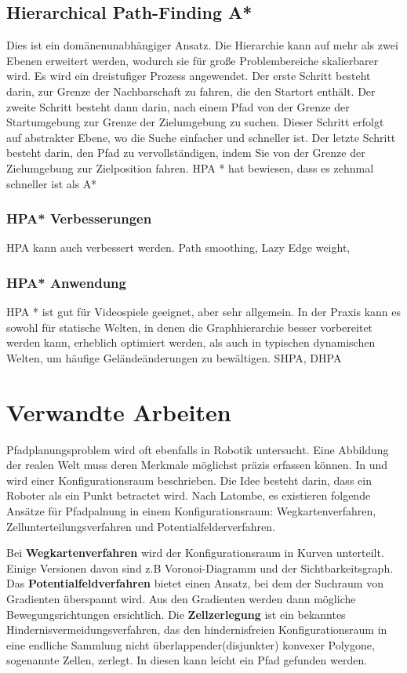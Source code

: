 \subsection{Hierarchical Path-Finding A*}
Dies ist ein domänenunabhängiger Ansatz. Die Hierarchie kann auf mehr als zwei Ebenen erweitert werden, wodurch sie für große Problembereiche skalierbarer wird. Es wird ein dreistufiger Prozess angewendet. Der erste Schritt besteht darin, zur Grenze der Nachbarschaft zu fahren, die den Startort enthält. Der zweite Schritt besteht dann darin, nach einem Pfad von der Grenze der Startumgebung zur Grenze der Zielumgebung zu suchen. Dieser Schritt erfolgt auf abstrakter Ebene, wo die Suche einfacher und schneller ist. Der letzte Schritt besteht darin, den Pfad zu vervollständigen, indem Sie von der Grenze der Zielumgebung zur Zielposition fahren. HPA * hat bewiesen, dass es zehnmal schneller ist als A*\cite{hpa}

\subsubsection{HPA* Verbesserungen}
HPA kann auch verbessert werden. Path smoothing, Lazy Edge weight,

\subsubsection{HPA* Anwendung}
HPA * ist gut für Videospiele geeignet, aber sehr allgemein. In der Praxis kann es sowohl für statische Welten, in denen die Graphhierarchie besser vorbereitet werden kann, erheblich optimiert werden, als auch in typischen dynamischen Welten, um häufige Geländeänderungen zu bewältigen. 
SHPA, 
DHPA






\section{Verwandte Arbeiten} 
Pfadplanungsproblem wird oft ebenfalls in Robotik untersucht. Eine Abbildung der realen Welt muss deren Merkmale möglichst präzis erfassen können. In \cite{lozano} und \cite{latombe} wird einer Konfigurationsraum beschrieben. Die Idee besteht darin, dass ein Roboter als ein Punkt betractet wird. Nach Latombe\cite{latombe}, es existieren folgende Ansätze für Pfadpalnung in einem Konfigurationsraum: Wegkartenverfahren, Zellunterteilungsverfahren und Potentialfelderverfahren. 

Bei \textbf{Wegkartenverfahren} wird der Konfigurationsraum in Kurven unterteilt. Einige Versionen davon sind z.B Voronoi-Diagramm\cite{voronoi} und der Sichtbarkeitsgraph\cite{visG1}. Das \textbf{Potentialfeldverfahren} bietet einen Ansatz, bei dem der Suchraum von Gradienten überspannt wird. Aus den Gradienten werden dann mögliche Bewegungsrichtungen ersichtlich. Die \textbf{Zellzerlegung}\cite{cd} ist ein bekanntes Hindernisvermeidungsverfahren, das den hindernisfreien Konfigurationsraum in eine endliche Sammlung nicht überlappender(disjunkter) konvexer Polygone, sogenannte Zellen, zerlegt. In diesen kann leicht ein Pfad gefunden werden.

